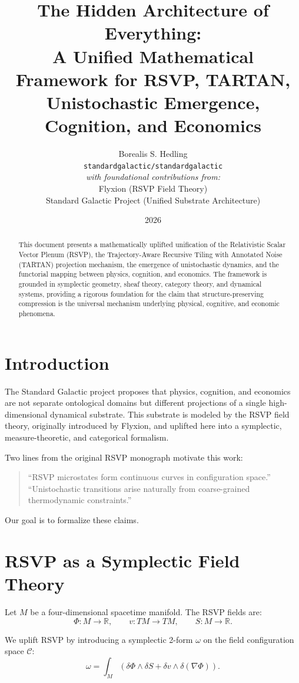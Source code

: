\documentclass[11pt]{article}
\title{The Hidden Architecture of Everything:\\
A Unified Mathematical Framework for RSVP, TARTAN,\\
Unistochastic Emergence, Cognition, and Economics}
\author{
Borealis S. Hedling \\
\texttt{standardgalactic/standardgalactic} \\
\vspace{0.2cm}
\textit{with foundational contributions from:}\\
Flyxion (RSVP Field Theory)\\
Standard Galactic Project (Unified Substrate Architecture)
}
\date{2026}
\begin{document}
\maketitle

\begin{abstract}
This document presents a mathematically uplifted unification of the Relativistic
Scalar Vector Plenum (RSVP), the Trajectory-Aware Recursive Tiling with Annotated
Noise (TARTAN) projection mechanism, the emergence of unistochastic dynamics,
and the functorial mapping between physics, cognition, and economics. The
framework is grounded in symplectic geometry, sheaf theory, category theory,
and dynamical systems, providing a rigorous foundation for the claim that
structure-preserving compression is the universal mechanism underlying physical,
cognitive, and economic phenomena.
\end{abstract}

\section{Introduction}

The Standard Galactic project proposes that physics, cognition, and economics
are not separate ontological domains but different projections of a single
high-dimensional dynamical substrate. This substrate is modeled by the RSVP
field theory, originally introduced by Flyxion, and uplifted here into a
symplectic, measure-theoretic, and categorical formalism.

Two lines from the original RSVP monograph motivate this work:
\begin{quote}
``RSVP microstates form continuous curves in configuration space.''\\
``Unistochastic transitions arise naturally from coarse-grained thermodynamic
constraints.''
\end{quote}

Our goal is to formalize these claims.

\section{RSVP as a Symplectic Field Theory}

Let $M$ be a four-dimensional spacetime manifold. The RSVP fields are:
\[
\Phi : M \to \mathbb{R}, \qquad
v : TM \to TM, \qquad
S : M \to \mathbb{R}.
\]

We uplift RSVP by introducing a symplectic 2-form $\omega$ on the field
configuration space $\mathcal{C}$:
\[
\omega = \int_M \left( \delta \Phi \wedge \delta S + \delta v \wedge \delta(\nabla \Phi) \right).
\]
\end{document}
